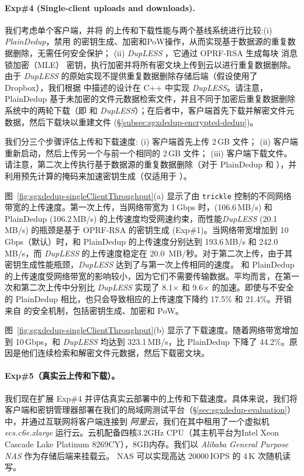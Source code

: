 \paragraph*{Exp\#4 (Single-client uploads and downloads).} 我们考虑单个客户端，并将 \sysnameS 的上传和下载性能与两个基线系统进行比较:(i) \textit{ PlainDedup}，禁用 \sysnameS 的密钥生成、加密和PoW操作，从而实现基于数据源的重复数据删除，无需任何安全保护； (ii) \textit{ {\em DupLESS}} \cite{bellare13b}，它通过 OPRF-RSA 生成每块 消息锁加密（MLE） 密钥，执行加密并将所有密文块上传到云以进行重复数据删除。由于 {\em DupLESS} 的原始实现不提供重复数据删除存储后端（假设使用了 Dropbox），我们根据 \cite{bellare13b} 中描述的设计在 C++ 中实现 {\em DupLESS}。请注意，PlainDedup 基于未加密的文件元数据检索文件，并且不同于加密后重复数据删除系统中的两轮下载（即 \sysnameS 和 {\em DupLESS}）；在后者中，客户端首先下载并解密文件元数据，然后下载块以重建文件 (\S\ref{subsec:sgxdedup-encrypted-dedup})。

我们分三个步骤评估上传和下载速度: (i) 客户端首先上传 2\,GB 文件； (ii) 客户端重新启动，然后上传另一个与前一个相同的 2\,GB 文件； (iii) 客户端下载文件。请注意，第二次上传执行基于数据源的重复数据删除（对于 PlainDedup 和 \sysnameS），并利用预先计算的掩码来加速密钥生成（仅适用于 \sysnameS）。

图~\ref{fig:sgxdedup-singleClientThroughput}(a) 显示了由 {\tt trickle} \cite{eriksen05} 控制的不同网络带宽的上传速度。第一次上传，当网络带宽为 1\,Gbps 时，\sysnameS (106.6\,MB/s) 和 PlainDedup (106.2\,MB/s) 的上传速度均受网速约束，而性能{\em DupLESS} (20.1\,MB/s) 的瓶颈是基于 OPRF-RSA 的密钥生成 (Exp\#1)。当网络带宽增加到 10\,Gbps（默认）时，\sysnameS 和 PlainDedup 的上传速度分别达到 193.6\,MB/s 和 242.0\,MB/s，而 {\em DupLESS} 的上传速度稳定在 20.0\, MB/秒。对于第二次上传，由于其密钥生成性能瓶颈，{\em DupLESS} 达到了与第一次上传相同的速度。 \sysnameS 和 PlainDedup 的上传速度受网络带宽的影响较小，因为它们不需要传输数据。平均而言，\sysnameS 在第一次和第二次上传中分别比 {\em DupLESS} 实现了 8.1$\times$ 和 9.6$\times$ 的加速。即使与不安全的 PlainDedup 相比，\sysnameS 也只会导致相应的上传速度下降约 17.5\% 和 21.4\%。开销来自 \sysnameS 的安全机制，包括密钥生成、加密和 PoW。

图~\ref{fig:sgxdedup-singleClientThroughput}(b) 显示了下载速度。随着网络带宽增加到 10\,Gbps，\sysnameS 和 {\em DupLESS} 均达到 323.1\,MB/s，比 PlainDedup 下降了 44.2\%。原因是他们连续检索和解密文件元数据，然后下载密文块。

\paragraph*{Exp\#5（真实云上传和下载）。} 我们现在扩展 Exp\#4 并评估真实云部署中的上传和下载速度。具体来说，我们将客户端和密钥管理器部署在我们的局域网测试平台（\S\ref{sec:sgxdedup-evaluation}）中，并通过互联网将客户端连接到\textit{ 阿里云}，我们在其中租用了一个虚拟机\textit{ ecs.c6e.xlarge} 运行云。云机配备四核3.2GHz CPU（其主机平台为Intel Xeon Cascade Lake Platinum 8269CY），8GB内存。我们以 \textit{ Alibaba General Purpose NAS} 作为存储后端来挂载云。 NAS 可以实现高达 20000\,IOPS 的 4\,K 次随机读写。

